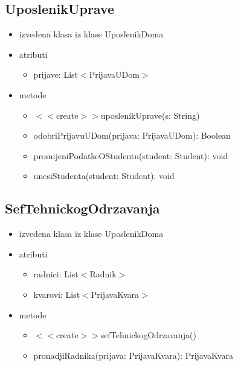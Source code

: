 \documentclass{article}
\begin{document}
\subsection*{UposlenikUprave}
 
\begin{itemize}
  \item izvedena klasa iz klase UposlenikDoma
  \item atributi
     \begin{itemize}
        \item prijave: List\(<\)PrijavaUDom\(>\)
     \end{itemize}
  \item metode
  \begin{itemize}
        \item \(<<\)create\(>>\)uposlenikUprave(s: String)
        \item odobriPrijavuUDom(prijava: PrijavaUDom): Boolean
        \item promijeniPodatkeOStudentu(student: Student): void
        \item unesiStudenta(student: Student): void
       
     \end{itemize}
 
\end{itemize}
 
\subsection*{SefTehnickogOdrzavanja}
 
\begin{itemize}
  \item izvedena klasa iz klase UposlenikDoma
  \item atributi
     \begin{itemize}
        \item radnici: List\(<\)Radnik\(>\)
        \item kvarovi: List\(<\)PrijavaKvara\(>\)
     \end{itemize}
  \item metode
  \begin{itemize}
        \item \(<<\)create\(>>\)sefTehnickogOdrzavanja()
        \item pronadjiRadnika(prijava: PrijavaKvara): PrijavaKvara
       
     \end{itemize}
 
\end{itemize}
 
\end{document}
